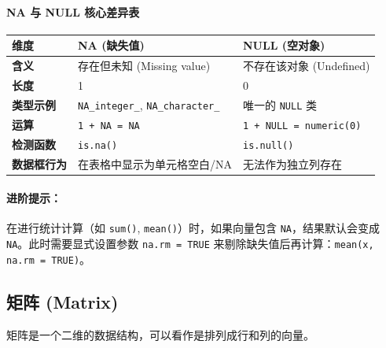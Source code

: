 \paragraph{NA 与 NULL 核心差异表}
\begin{table}[h]
\centering
\renewcommand{\arraystretch}{1.5}
\begin{tabular}{|l|p{5cm}|p{5cm}|}
\hline
\textbf{维度} & \textbf{NA (缺失值)} & \textbf{NULL (空对象)} \\ \hline
\textbf{含义} & 存在但未知 (Missing value) & 不存在该对象 (Undefined) \\ \hline
\textbf{长度} & 1 & 0 \\ \hline
\textbf{类型示例} & \texttt{NA\_integer\_}, \texttt{NA\_character\_} & 唯一的 \texttt{NULL} 类 \\ \hline
\textbf{运算} & \texttt{1 + NA = NA} & \texttt{1 + NULL = numeric(0)} \\ \hline
\textbf{检测函数} & \texttt{is.na()} & \texttt{is.null()} \\ \hline
\textbf{数据框行为} & 在表格中显示为单元格空白/NA & 无法作为独立列存在 \\ \hline
\end{tabular}
\end{table}

\paragraph{进阶提示：}
在进行统计计算（如 \texttt{sum()}, \texttt{mean()}）时，如果向量包含 \texttt{NA}，结果默认会变成 \texttt{NA}。此时需要显式设置参数 \texttt{na.rm = TRUE} 来剔除缺失值后再计算：\texttt{mean(x, na.rm = TRUE)}。

\subsection{矩阵 (Matrix)}

矩阵是一个二维的数据结构，可以看作是排列成行和列的向量。

